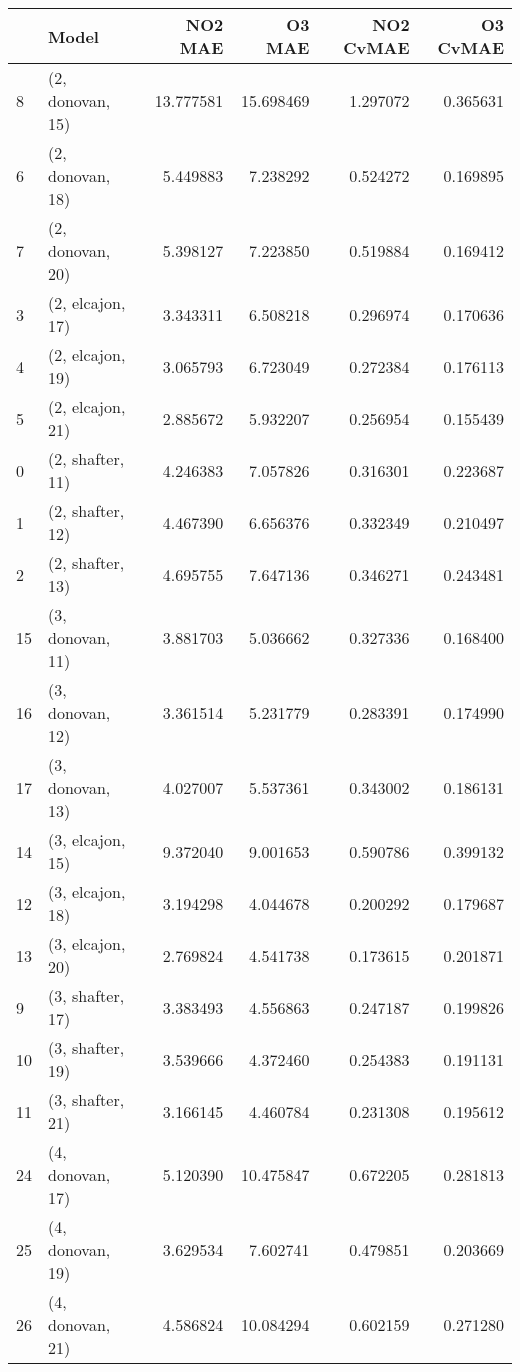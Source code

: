 \begin{tabular}{llrrrr}
\toprule
{} &             Model &    NO2 MAE &     O3 MAE &  NO2 CvMAE &  O3 CvMAE \\
\midrule
8  &  (2, donovan, 15) &  13.777581 &  15.698469 &   1.297072 &  0.365631 \\
6  &  (2, donovan, 18) &   5.449883 &   7.238292 &   0.524272 &  0.169895 \\
7  &  (2, donovan, 20) &   5.398127 &   7.223850 &   0.519884 &  0.169412 \\
3  &  (2, elcajon, 17) &   3.343311 &   6.508218 &   0.296974 &  0.170636 \\
4  &  (2, elcajon, 19) &   3.065793 &   6.723049 &   0.272384 &  0.176113 \\
5  &  (2, elcajon, 21) &   2.885672 &   5.932207 &   0.256954 &  0.155439 \\
0  &  (2, shafter, 11) &   4.246383 &   7.057826 &   0.316301 &  0.223687 \\
1  &  (2, shafter, 12) &   4.467390 &   6.656376 &   0.332349 &  0.210497 \\
2  &  (2, shafter, 13) &   4.695755 &   7.647136 &   0.346271 &  0.243481 \\
15 &  (3, donovan, 11) &   3.881703 &   5.036662 &   0.327336 &  0.168400 \\
16 &  (3, donovan, 12) &   3.361514 &   5.231779 &   0.283391 &  0.174990 \\
17 &  (3, donovan, 13) &   4.027007 &   5.537361 &   0.343002 &  0.186131 \\
14 &  (3, elcajon, 15) &   9.372040 &   9.001653 &   0.590786 &  0.399132 \\
12 &  (3, elcajon, 18) &   3.194298 &   4.044678 &   0.200292 &  0.179687 \\
13 &  (3, elcajon, 20) &   2.769824 &   4.541738 &   0.173615 &  0.201871 \\
9  &  (3, shafter, 17) &   3.383493 &   4.556863 &   0.247187 &  0.199826 \\
10 &  (3, shafter, 19) &   3.539666 &   4.372460 &   0.254383 &  0.191131 \\
11 &  (3, shafter, 21) &   3.166145 &   4.460784 &   0.231308 &  0.195612 \\
24 &  (4, donovan, 17) &   5.120390 &  10.475847 &   0.672205 &  0.281813 \\
25 &  (4, donovan, 19) &   3.629534 &   7.602741 &   0.479851 &  0.203669 \\
26 &  (4, donovan, 21) &   4.586824 &  10.084294 &   0.602159 &  0.271280 \\

\end{tabular}
